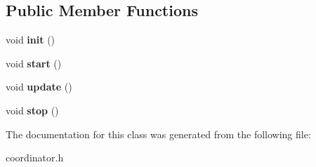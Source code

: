 \subsection*{Public Member Functions}
\begin{DoxyCompactItemize}
\item 
\mbox{\label{classCoordinatorController_aadbb6ec1adad8359b9898590af18b7ff}} 
void {\bfseries init} ()
\item 
\mbox{\label{classCoordinatorController_a5b0e4d28b82a953cba030a90e5412c3a}} 
void {\bfseries start} ()
\item 
\mbox{\label{classCoordinatorController_ac4a102259abb9389dbe84d1f22909e92}} 
void {\bfseries update} ()
\item 
\mbox{\label{classCoordinatorController_ae69ecb3b5074de75c1753d6f188ba1c2}} 
void {\bfseries stop} ()
\end{DoxyCompactItemize}


The documentation for this class was generated from the following file\+:\begin{DoxyCompactItemize}
\item 
coordinator.\+h\end{DoxyCompactItemize}
